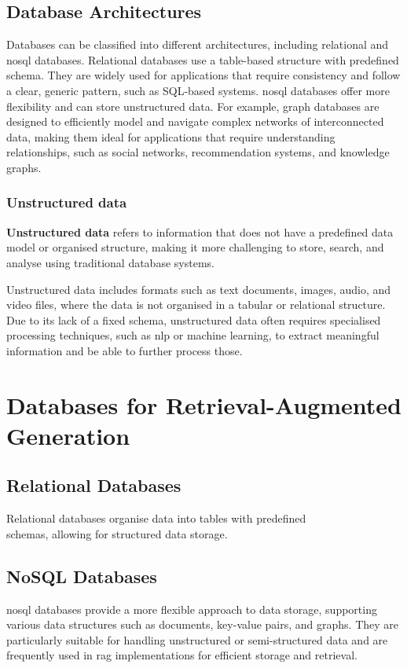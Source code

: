 \subsection{Database Architectures}\label{sec:database-architectures}
Databases can be classified into different architectures, including relational and \ac{nosql} databases. 
Relational databases use a table-based structure with predefined schema. 
They are widely used for applications that require consistency and follow a clear, generic pattern, such as SQL-based systems.
\ac{nosql} databases offer more flexibility and can store unstructured data. 
For example, graph databases are designed to efficiently model and navigate complex networks of interconnected data, making them ideal for applications that require understanding relationships, such as social networks, recommendation systems, and knowledge graphs.
\subsubsection{Unstructured data}\label{sec:unstructured-data}
\begin{definition}\label{def:unstructured-data}
    \textbf{Unstructured data} refers to information that does not have a predefined data model or organised structure, making it more challenging to store, search, and analyse using traditional database systems.
\end{definition}
Unstructured data includes formats such as text documents, images, audio, and video files, where the data is not organised in a tabular or relational structure. 
Due to its lack of a fixed schema, unstructured data often requires specialised processing techniques, such as \ac{nlp} or machine learning, to extract meaningful information and be able to further process those.
\section{Databases for Retrieval-Augmented Generation}\label{sec:databases-rag}

\subsection{Relational Databases}\label{sec:relational-databases}
Relational databases organise data into tables with predefined\\ schemas, allowing for structured data storage. 

\subsection{NoSQL Databases}\label{sec:nosql-databases}
\ac{nosql} databases provide a more flexible approach to data storage, supporting various data structures such as documents, key-value pairs, and graphs. 
They are particularly suitable for handling unstructured or semi-structured data and are frequently used in \ac{rag} implementations for efficient storage and retrieval.

